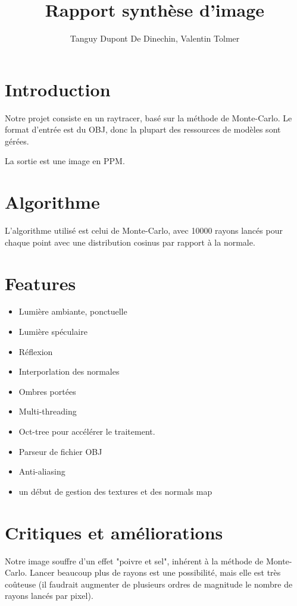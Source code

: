 \documentclass{article}
\title{Rapport synthèse d'image}
\author{Tanguy Dupont De Dinechin, Valentin Tolmer}
\begin{document}
\maketitle

\section{Introduction}

Notre projet consiste en un raytracer, basé sur la méthode de Monte-Carlo. Le
format d'entrée est du OBJ, donc la plupart des ressources de modèles sont
gérées.

La sortie est une image en PPM.

\section{Algorithme}

L'algorithme utilisé est celui de Monte-Carlo, avec 10000 rayons lancés pour
chaque point avec une distribution cosinus par rapport à la normale.

\section{Features}

\begin{itemize}
  \item Lumière ambiante, ponctuelle
  \item Lumière spéculaire
  \item Réflexion
  \item Interporlation des normales
  \item Ombres portées
  \item Multi-threading
  \item Oct-tree pour accélérer le traitement.
  \item Parseur de fichier OBJ
  \item Anti-aliasing
  \item un début de gestion des textures et des normals map
\end{itemize}

\section{Critiques et améliorations}

Notre image souffre d'un effet "poivre et sel", inhérent à la méthode de
Monte-Carlo. Lancer beaucoup plus de rayons est une possibilité, mais elle est
très coûteuse (il faudrait augmenter de plusieurs ordres de magnitude le nombre
de rayons lancés par pixel).
\end{document}
